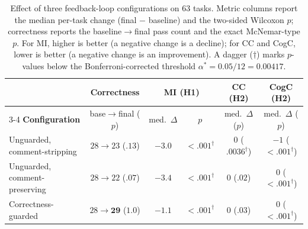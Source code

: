 \begin{table}[t]
  \centering
  \caption{Effect of three feedback-loop configurations on 63 tasks. Metric
    columns report the median per-task change (final $-$ baseline) and the
    two-sided Wilcoxon $p$; correctness reports the baseline$\rightarrow$final
    pass count and the exact McNemar-type $p$. For MI, higher is better (a negative
    change is a decline); for CC and CogC, lower is better (a negative change is
    an improvement). A dagger ($\dagger$) marks $p$-values below the
    Bonferroni-corrected threshold $\alpha^\ast = 0.05/12 = 0.00417$.}
  \label{tab:results}
  \begin{tabular}{lccccc}
    \toprule
    & \textbf{Correctness} & \multicolumn{2}{c}{\textbf{MI (H1)}}
      & \textbf{CC (H2)} & \textbf{CogC (H2)} \\
    \cmidrule(lr){3-4}
    \textbf{Configuration} & base$\rightarrow$final ($p$) & med.\ $\Delta$ & $p$
      & med.\ $\Delta$ ($p$) & med.\ $\Delta$ ($p$) \\
    \midrule
    Unguarded, comment-stripping    & $28\!\to\!23$ ($.13$)  & $-3.0$ & $<.001^\dagger$ & $0$ ($.0036^\dagger$) & $-1$ ($<.001^\dagger$) \\
    Unguarded, comment-preserving   & $28\!\to\!22$ ($.07$)  & $-3.4$  & $<.001^\dagger$ & $0$ ($.02$)    & $0$ ($<.001^\dagger$) \\
    Correctness-guarded             & $28\!\to\!\mathbf{29}$ ($1.0$) & $-1.1$ & $<.001^\dagger$ & $0$ ($.03$)  & $0$ ($<.001^\dagger$) \\
    \bottomrule
  \end{tabular}
\end{table}

